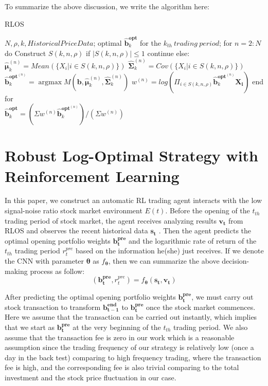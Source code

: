 \documentclass{gapd}
\begin{document}
To summarize the above discussion, we write the algorithm here:
  \begin{algorithm}[htb]  
  \caption{ RLOS}  
  \label{alg:Framwork}  
  \begin{algorithmic}[1]  
    \Require
      $N,\rho,k,Historical Price Data$;  
    \Ensure  
      optimal $\mathbf{\hat{b}}_{k}^{\mathbf{opt}}$ for the $k_{th}\ trading\ period$;  
    \State for $n=2:N$ do  
    \State \quad Construct $S(k,n,\rho)$
    \State \quad if $|S(k,n,\rho)| \le 1$  
    \State \quad \quad continue
    \State \quad else:  
    \State \quad \quad ${\hat{\boldsymbol{\mu}}}_k^{(n)}=Mean(\{X_i|i\in S(k,n,\rho)\})$
    \State \quad \quad${\hat{\boldsymbol{\Sigma}}}_k^{(n)}=Cov(\{X_i|i \in S(k,n,\rho)\})$
    \State \quad \quad$\mathbf{\hat{b}}_{k}^{\mathbf{opt}^{(n)}}=\mathop{\arg\max} M(\mathbf{b},{\hat{\boldsymbol{\mu}}}_k^{(n)},{\hat{\boldsymbol{\Sigma}}}_k^{(n)})$
    \State \quad \quad $w^{(n)}=log(\Pi_{i \in S(k,n,\rho)}\mathbf{\hat{b}}_{k}^{\mathbf{opt}^{(n)}}\mathbf{X_i})$
    \State end for\\
    \Return $\mathbf{\hat{b}}_{k}^{\mathbf{opt}}=(\Sigma w^{(n)}\mathbf{\hat{b}}_{k}^{\mathbf{opt}^{(n)}})/(\Sigma w^{(n)})$
  \end{algorithmic}  
\end{algorithm}  

\section{Robust Log-Optimal Strategy with Reinforcement Learning}

In this paper, we construct an automatic RL trading agent interacts with the low signal-noise ratio stock market environment $E(t)$. Before the opening of the $t_{th}$ trading period of stock market, the agent receives analyzing results $\mathbf{v_t}$ from RLOS and observes the recent historical data $\mathbf{s_t}$ . Then the agent predicts the optimal opening portfolio weights $\mathbf{b_t^{pre}}$ and the logarithmic rate of return of the $t_{th}$ trading period $r_t^{pre}$ based on the information he(she) just receives. If we denote the CNN with parameter $\boldsymbol{\theta}$ as $f_{\boldsymbol{\theta}}$, then we can summarize the above decision-making process as follow:
\begin{equation}
(\mathbf{b_t^{pre}},r_t^{pre})=f_{\boldsymbol{\theta}}(\mathbf{s_t},\mathbf{v_t})
\end{equation}

After predicting the optimal opening portfolio weights $\mathbf{b_t^{pre}}$, we must carry out stock transaction to transform $\mathbf{b_{t-1}^{end}}$ to $\mathbf{b_t^{pre}}$ once the stock market commences. Here we assume that the transaction can be carried out instantly, which implies that we start as $\mathbf{b_t^{pre}}$ at the very beginning of the $t_{th}$ trading period. We also assume that the transaction fee is zero in our work which is a reasonable assumption since the trading frequency of our strategy is relatively low (once a day in the back test) comparing to high frequency trading, where the transaction fee is high, and the corresponding fee is also trivial comparing to the total investment and the stock price fluctuation in our case.
\end{document}
